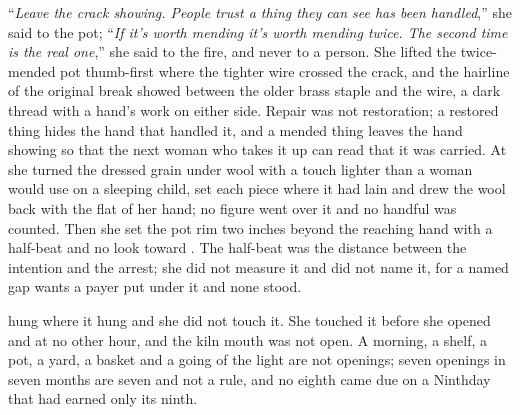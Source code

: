 “\emph{Leave the crack showing. People trust a thing they can see has been handled},” she said to the pot; “\emph{If it's worth mending it's worth mending twice. The second time is the real one},” she said to the fire, and never to a person. She lifted the twice-mended pot thumb-first where the tighter wire crossed the crack, and the hairline of the original break showed between the older brass staple and the wire, a dark thread with a hand's work on either side. Repair was not restoration; a restored thing hides the hand that handled it, and a mended thing leaves the hand showing so that the next woman who takes it up can read that it was carried. At  she turned the dressed grain under wool with a touch lighter than a woman would use on a sleeping child, set each piece where it had lain and drew the wool back with the flat of her hand; no figure went over it and no handful was counted. Then she set the pot rim two inches beyond the reaching hand with a half-beat and no look toward . The half-beat was the distance between the intention and the arrest; she did not measure it and did not name it, for a named gap wants a payer put under it and none stood.

 hung where it hung and she did not touch it. She touched it before she opened  and at no other hour, and the kiln mouth was not open. A morning, a shelf, a pot, a yard, a basket and a going of the light are not openings; seven openings in seven months are seven and not a rule, and no eighth came due on a Ninthday that had earned only its ninth.

